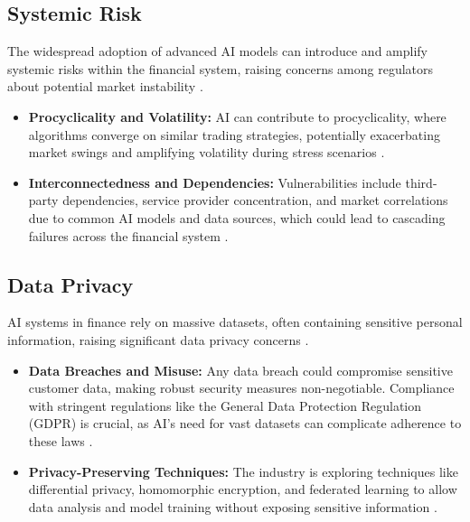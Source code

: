 \subsection{Systemic Risk}
The widespread adoption of advanced AI models can introduce and amplify systemic risks within the financial system, raising concerns among regulators about potential market instability \cite{NIH_SystemicRisk}.
\begin{itemize}
    \item \textbf{Procyclicality and Volatility:} AI can contribute to procyclicality, where algorithms converge on similar trading strategies, potentially exacerbating market swings and amplifying volatility during stress scenarios \cite{LSE_SystemicRisk, Sidley_SystemicRisk}.
    \item \textbf{Interconnectedness and Dependencies:} Vulnerabilities include third-party dependencies, service provider concentration, and market correlations due to common AI models and data sources, which could lead to cascading failures across the financial system \cite{FSB_SystemicRisk_1, FSB_SystemicRisk_2}.
\end{itemize}

\subsection{Data Privacy}
AI systems in finance rely on massive datasets, often containing sensitive personal information, raising significant data privacy concerns \cite{Medium_DataPrivacy}.
\begin{itemize}
    \item \textbf{Data Breaches and Misuse:} Any data breach could compromise sensitive customer data, making robust security measures non-negotiable. Compliance with stringent regulations like the General Data Protection Regulation (GDPR) is crucial, as AI's need for vast datasets can complicate adherence to these laws \cite{GDPRLocal_DataPrivacy, Nasdaq_DataPrivacy}.
    \item \textbf{Privacy-Preserving Techniques:} The industry is exploring techniques like differential privacy, homomorphic encryption, and federated learning to allow data analysis and model training without exposing sensitive information \cite{Wissen_DataPrivacy}.
\end{itemize}

